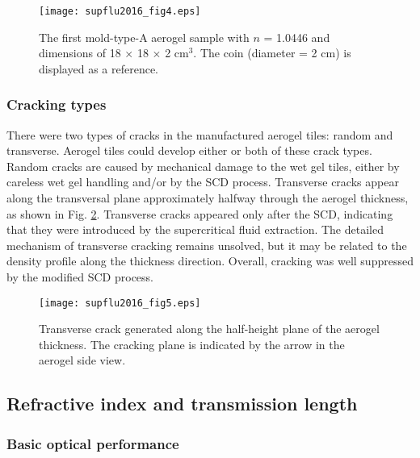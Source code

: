 \documentclass[5p,twocolumn]{elsarticle}
\begin{document}
\begin{figure}[t]
\centering 
\texttt{[image: supflu2016\_fig4.eps]}
\caption{The first mold-type-A aerogel sample with $n$ = 1.0446 and dimensions of 18 $\times $ 18 $\times $ 2 cm$^3$. The coin (diameter = 2 cm) is displayed as a reference.}
\label{fig:fig4}
\end{figure}

\subsubsection{Cracking types}
\label{5-1-4}

There were two types of cracks in the manufactured aerogel tiles: random and transverse. Aerogel tiles could develop either or both of these crack types. Random cracks are caused by mechanical damage to the wet gel tiles, either by careless wet gel handling and/or by the SCD process. Transverse cracks appear along the transversal plane approximately halfway through the aerogel thickness, as shown in Fig. \ref{fig:fig5}. Transverse cracks appeared only after the SCD, indicating that they were introduced by the supercritical fluid extraction. The detailed mechanism of transverse cracking remains unsolved, but it may be related to the density profile along the thickness direction. Overall, cracking was well suppressed by the modified SCD process.

\begin{figure}[t]
\centering 
\texttt{[image: supflu2016\_fig5.eps]}
\caption{Transverse crack generated along the half-height plane of the aerogel thickness. The cracking plane is indicated by the arrow in the aerogel side view.}
\label{fig:fig5}
\end{figure}

\subsection{Refractive index and transmission length}
\label{5-2}

\subsubsection{Basic optical performance}
\label{5-2-1}
\end{document}
